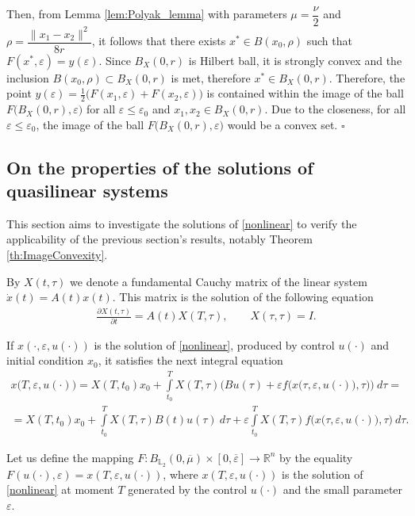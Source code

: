 \documentclass[../main.tex]{subfiles}
\begin{document}
Then, from Lemma \ref{lem:Polyak_lemma} with parameters $\mu=\dfrac{\nu}{2}$ and $\rho=\dfrac{\|x_1-x_2\|^2}{8r}$, it follows that there exists $x^*\in B(x_0, \rho)$ such that $F(x^*,\varepsilon) = y(\varepsilon)$.
Since $B_X(0, r)$ is Hilbert ball, it is strongly convex and the inclusion $B(x_0, \rho) \subset B_X(0, r)$ is met, therefore $x^* \in B_X(0, r)$. Therefore, the point  $y(\varepsilon) = \frac{1}{2} \big( F(x_1,\varepsilon) + F(x_2,\varepsilon)\big)$ is contained within the image of the ball $F\big(B_X(0,r),\varepsilon\big) $ for all  $\varepsilon \leqslant \varepsilon_0$ and $x_1, x_2 \in B_X(0,r)$. Due to the closeness, for all $\varepsilon \leqslant \varepsilon_0$, the image of the ball $F\big(B_X(0,r),\varepsilon\big) $  would be a convex set.
\hfill$\square$\\[1ex]%

\subsection{On the properties of the solutions of quasilinear systems}
\setcounter{equation}{0}


This section aims to investigate the solutions of \eqref{nonlinear} to verify the applicability of the previous section's results, notably Theorem \ref{th:ImageConvexity}. 

By $X(t,\tau)$ we denote a fundamental Cauchy matrix of the linear system $\dot{x}(t) = A(t) x(t)$. This matrix is the solution of the following equation
\begin{gather*}
	\frac{\partial X(t,\tau)}{\partial t} = A(t) X(T,\tau), \qquad X(\tau,\tau) = I.
\end{gather*}

If $x(\cdot,\varepsilon, u(\cdot))$ is the solution of \eqref{nonlinear}, produced by control $u(\cdot)$ and initial condition $x_0$, it satisfies the next integral equation
\begin{gather*}
	x\big(T,\varepsilon, u(\cdot)\big) =
	X(T,t_0)x_0 + 
	\int\limits_{t_0}^T X(T,\tau) \bigg(Bu(\tau) +
	\varepsilon f\Big(x\big(\tau,\varepsilon, u(\cdot)\big),\tau\Big) \bigg)\ d\tau = \\ =
	X(T,t_0)x_0 +
	\int\limits_{t_0}^T X(T,\tau) B(t)u(\tau)\ d\tau 
	+ \varepsilon \int\limits_{t_0}^T X(T,\tau) f\Big(x\big(\tau,\varepsilon, u(\cdot)\big),\tau\Big) \ d\tau.
\end{gather*}

Let us define the mapping $F:B_{\mathbb{L}_2}(0,\overline{\mu})\times [0,\overline{\varepsilon}] \to \mathbb{R}^n$ by the equality $F(u(\cdot),\varepsilon) = x(T,\varepsilon,u(\cdot))$, where $x(T,\varepsilon,u(\cdot))$ is the solution of \eqref{nonlinear} at moment $T$ generated by the control $u(\cdot)$ and the small parameter $\varepsilon$.
\end{document}
